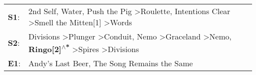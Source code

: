 \begin{supertabular}{p{0.03\textwidth}p{0.92\textwidth}}
 \textbf{S1}:  &                                                                                                        2nd Self\textsuperscript{}, \enspace Water\textsuperscript{}, \enspace Push the Pig\textsuperscript{} \textgreater \enspace Roulette\textsuperscript{}, \enspace Intentions Clear\textsuperscript{} \textgreater \enspace Smell the Mitten[1]\textsuperscript{} \textgreater \enspace Words\textsuperscript{}  \enspace  \\
 \textbf{S2}:  &  Divisions\textsuperscript{} \textgreater \enspace Plunger\textsuperscript{} \textgreater \enspace Conduit\textsuperscript{}, \enspace Nemo\textsuperscript{} \textgreater \enspace Graceland\textsuperscript{} \textgreater \enspace Nemo\textsuperscript{}, \enspace \textbf{Ringo[2]\textsuperscript{$\wedge$*}} \textgreater \enspace Spires\textsuperscript{} \textgreater \enspace Divisions\textsuperscript{}  \enspace  \\
 \textbf{E1}:  &                                                                                                                                                                                                                                                                                                                             Andy's Last Beer\textsuperscript{}, \enspace The Song Remains the Same\textsuperscript{}  \enspace  \\
\end{supertabular}
